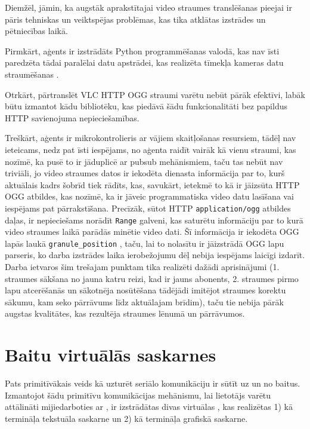Diemžēl, jāmin, ka augstāk aprakstītajai video straumes translēšanas pieejai ir
pāris tehniskas un veiktspējas problēmas, kas tika atklātas izstrādes un
pētniecības laikā.

Pirmkārt, aģents ir izstrādāts Python programmēšanas valodā, kas nav īsti
paredzēta tādai paralēlai datu apstrādei, kas realizēta tīmekļa kameras datu
straumēšanas .

Otrkārt, pārtranslēt VLC HTTP OGG straumi varētu nebūt pārāk efektīvi, labāk
būtu izmantot kādu bibliotēku, kas piedāvā šādu funkcionalitāti bez papildus
HTTP savienojuma nepieciešamības.

Treškārt, aģents ir mikrokontrolieris ar vājiem skaitļošanas resursiem, tādēļ
nav ieteicams, nedz pat īsti iespējams, no aģenta raidīt vairāk kā vienu
straumi, kas nozīmē, ka  pusē to ir jāduplicē ar
\gls{pubsub} mehānismiem, taču tas nebūt nav triviāli, jo video straumes datos
ir iekodēta dienasta informācija par to, kurš aktuālais kadrs šobrīd tiek
rādīts, kas, savukārt, ietekmē to kā  ir jāizsūta HTTP
OGG atbildes, kas nozīmē, ka ir jāveic programmatiska video datu lasīšana vai
iespējams pat pārrakstīšana. Precīzāk, sūtot HTTP \lstinline!application/ogg!
atbildes daļas, ir nepieciešams norādīt \lstinline!Range! galveni, kas saturētu
informāciju par to kurā video straumes laikā parādās minētie video dati.
\cite[para. 14.35.2]{RFC2616} Šī informācija ir iekodēta OGG lapās laukā
\lstinline!granule_position! \cite[para 6., A]{RFC3533}, taču, lai to nolasītu
ir jāizstrādā OGG lapu parseris, ko darba izstrādes laika ierobežojumu dēļ
nebija iespējams laicīgi izdarīt. Darba ietvaros šim trešajam punktam tika
realizēti dažādi aprisinājumi (1. straumes sākšana no jauna katru reizi, kad ir
jauns abonents, 2. straumes pirmo lapu atcerēšanās un sākotnēja nosūtēšana
tādējādi imitējot straumes korektu sākumu, kam seko pārrāvums līdz aktuālajam
brīdim), taču tie nebija pārāk augstas kvalitātes, kas rezultēja straumes lēnumā
un pārrāvumos. 

\section{Baitu virtuālās saskarnes}
\label{sec:vinbytes}

Pats primitīvākais veids kā uzturēt seriālo komunikāciju ir sūtīt uz un no
 baitus. Izmantojot šādu primitīvu komunikācijas
mehānismu, lai lietotājs varētu attālināti mijiedarboties ar
, ir izstrādātas divas virtuālas
, kas realizētas 1) kā termināļa tekstuāla
saskarne un 2) kā termināļa grafiskā saskarne.

